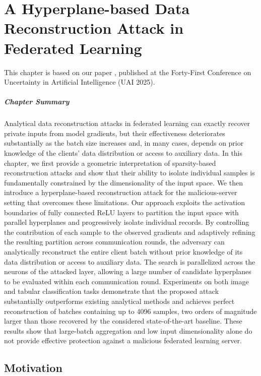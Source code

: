 \chapter{A Hyperplane-based Data Reconstruction Attack in Federated Learning}\label{chap:ctp}

This chapter is based on our paper , published at the Forty-First Conference on Uncertainty in Artificial Intelligence (UAI 2025).
 
\paragraph{Chapter Summary} Analytical data reconstruction attacks in federated learning can exactly recover private inputs from model gradients, but their effectiveness deteriorates substantially as the batch size increases and, in many cases, depends on prior knowledge of the clients' data distribution or access to auxiliary data. In this chapter, we first provide a geometric interpretation of sparsity-based reconstruction attacks and show that their ability to isolate individual samples is fundamentally constrained by the dimensionality of the input space. We then introduce a hyperplane-based reconstruction attack for the malicious-server setting that overcomes these limitations. Our approach exploits the activation boundaries of fully connected ReLU layers to partition the input space with parallel hyperplanes and progressively isolate individual records. By controlling the contribution of each sample to the observed gradients and adaptively refining the resulting partition across communication rounds, the adversary can analytically reconstruct the entire client batch without prior knowledge of its data distribution or access to auxiliary data. The search is parallelized across the neurons of the attacked layer, allowing a large number of candidate hyperplanes to be evaluated within each communication round. Experiments on both image and tabular classification tasks demonstrate that the proposed attack substantially outperforms existing analytical methods and achieves perfect reconstruction of batches containing up to 4096 samples, two orders of magnitude larger than those recovered by the considered state-of-the-art baseline. These results show that large-batch aggregation and low input dimensionality alone do not provide effective protection against a malicious federated learning server.

\section{Motivation}

